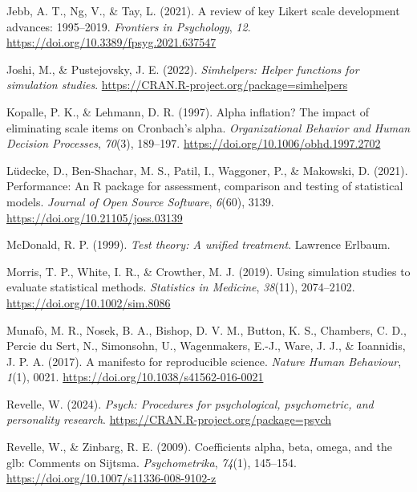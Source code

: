 \documentclass[
  nonatbib,
  authoryear,
  preprint]{elsarticle}
\newlength{\cslhangindent}
\newenvironment{CSLReferences}[2] %
 {\begin{list}{}{%
  \setlength{\itemindent}{0pt}
  \setlength{\leftmargin}{0pt}
  \setlength{\parsep}{0pt}
  \ifodd #1
   \setlength{\leftmargin}{\cslhangindent}
   \setlength{\itemindent}{-1\cslhangindent}
  \fi
  \setlength{\itemsep}{#2\baselineskip}}}
 {\end{list}}
\begin{document}
\begin{CSLReferences}{1}{0}
Jebb, A. T., Ng, V., \& Tay, L. (2021). A review of key {Likert} scale
development advances: 1995--2019. \emph{Frontiers in Psychology},
\emph{12}. \url{https://doi.org/10.3389/fpsyg.2021.637547}

Joshi, M., \& Pustejovsky, J. E. (2022). \emph{Simhelpers: {Helper}
functions for simulation studies}.
\url{https://CRAN.R-project.org/package=simhelpers}

Kopalle, P. K., \& Lehmann, D. R. (1997). Alpha inflation? {The} impact
of eliminating scale items on {Cronbach}'s alpha. \emph{Organizational
Behavior and Human Decision Processes}, \emph{70}(3), 189--197.
\url{https://doi.org/10.1006/obhd.1997.2702}

Lüdecke, D., Ben-Shachar, M. S., Patil, I., Waggoner, P., \& Makowski,
D. (2021). Performance: {An} {R} package for assessment, comparison and
testing of statistical models. \emph{Journal of Open Source Software},
\emph{6}(60), 3139. \url{https://doi.org/10.21105/joss.03139}

McDonald, R. P. (1999). \emph{Test theory: {A} unified treatment}.
Lawrence Erlbaum.

Morris, T. P., White, I. R., \& Crowther, M. J. (2019). Using simulation
studies to evaluate statistical methods. \emph{Statistics in Medicine},
\emph{38}(11), 2074--2102. \url{https://doi.org/10.1002/sim.8086}

Munafò, M. R., Nosek, B. A., Bishop, D. V. M., Button, K. S., Chambers,
C. D., Percie du Sert, N., Simonsohn, U., Wagenmakers, E.-J., Ware, J.
J., \& Ioannidis, J. P. A. (2017). A manifesto for reproducible science.
\emph{Nature Human Behaviour}, \emph{1}(1), 0021.
\url{https://doi.org/10.1038/s41562-016-0021}

Revelle, W. (2024). \emph{Psych: {Procedures} for psychological,
psychometric, and personality research}.
\url{https://CRAN.R-project.org/package=psych}

Revelle, W., \& Zinbarg, R. E. (2009). Coefficients alpha, beta, omega,
and the glb: {Comments} on {Sijtsma}. \emph{Psychometrika},
\emph{74}(1), 145--154. \url{https://doi.org/10.1007/s11336-008-9102-z}


\end{CSLReferences}
\end{document}

